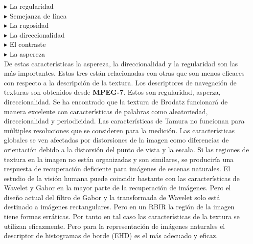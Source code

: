 \documentclass{llncs}
\begin{document}
\noindent$\blacktriangleright $ La regularidad\\
$\blacktriangleright $ Semejanza de l\'inea\\
$\blacktriangleright $ La rugosidad\\
$\blacktriangleright $ La direccionalidad\\
$\blacktriangleright $ El contraste\\
$\blacktriangleright $ La aspereza\\

De estas caracter\'isticas la aspereza, la direccionalidad y la regularidad son las m\'as importantes. Estas tres est\'an relacionadas 
con otras que son menos eficaces con respecto a la descripci\'on de la textura. Los descriptores de navegaci\'on de texturas son 
obtenidos desde \textbf{MPEG-7}. Estos son regularidad, asperza, direccionalidad. Se ha encontrado que la textura de Brodatz funcionar\'a
de manera excelente con caracter\'isticas de palabras como aleatoriedad, direccionalidad y periodicidad. Las caracter\'isticas de Tamura
no funcionan para m\'ultiples resoluciones que se consideren para la medici\'on. Las caracter\'isticas globales se ven afectadas por 
distorsiones de la imagen como diferencias de orientaci\'on debido a la distorsi\'on del punto de vista y la escala. Si las regiones
de textura en la imagen no est\'an organizadas y son similares, se producir\'ia una respuesta de recuperaci\'on deficiente para im\'agenes
de escenas naturales. El estudio de la visi\'on humana puede coincidir bastante con las caracter\'isticas de Wavelet y Gabor en la mayor 
parte de la recuperaci\'on de im\'agenes. Pero el dise\~{n}o actual del filtro de Gabor y la transformada de Wavelet solo est\'a 
destinado a im\'agenes rectangulares. Pero en un RBIR la regi\'on  de la imagen tiene formas err\'aticas. Por tanto en tal caso las 
caracter\'isticas de la textura se utilizan eficazmente. Pero para la representaci\'on de im\'agenes naturales el descriptor de histogramas
de borde (EHD) es el m\'as adecuado y eficaz.\\
\end{document}
